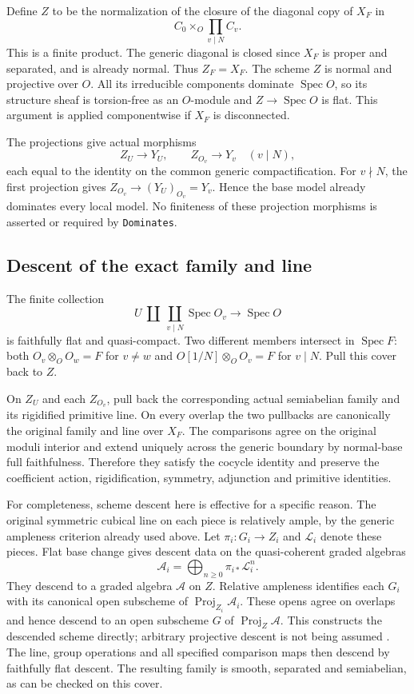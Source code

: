 Define $Z$ to be the normalization of the closure of the
diagonal copy of $X_F$ in
\[
                         C_0\times_O\prod_{v\mid N} C_v.
\]
This is a finite product.  The generic diagonal is closed since
$X_F$ is proper and separated, and is already normal.
Thus $Z_F=X_F$.  The scheme $Z$ is normal and projective over
$O$.  All its irreducible components dominate $\operatorname{Spec}O$,
so its structure sheaf is torsion-free as an $O$-module and
$Z\to\operatorname{Spec}O$ is flat.  This argument is applied
componentwise if $X_F$ is disconnected.

The projections give actual morphisms
\[
             Z_U\longrightarrow Y_U,
             \qquad Z_{O_v}\longrightarrow Y_v\quad(v\mid N),
\]
each equal to the identity on the common generic compactification.
For $v\nmid N$, the first projection gives
$Z_{O_v}\to(Y_U)_{O_v}=Y_v$.  Hence the base model already
dominates every local model.  No finiteness of these projection
morphisms is asserted or required by \texttt{Dominates}.

\subsection*{Descent of the exact family and line}

The finite collection
\[
 U\ \amalg\ \coprod_{v\mid N}\operatorname{Spec}O_v
                      \longrightarrow\operatorname{Spec}O
\]
is faithfully flat and quasi-compact.  Two different members
intersect in $\operatorname{Spec}F$: both
$O_v\otimes_OO_w=F$ for $v\ne w$ and
$O[1/N]\otimes_OO_v=F$ for $v\mid N$.
Pull this cover back to $Z$.

On $Z_U$ and each $Z_{O_v}$, pull back the corresponding actual
semiabelian family and its rigidified primitive line.
On every overlap the two pullbacks are canonically the original
family and line over $X_F$.  The comparisons agree on the
original moduli interior and extend uniquely across the generic
boundary by normal-base full faithfulness.  Therefore they
satisfy the cocycle identity and preserve the coefficient action,
rigidification, symmetry, adjunction and primitive identities.

For completeness, scheme descent here is effective for a
specific reason.  The original symmetric cubical line on each
piece is relatively ample, by the generic ampleness criterion
already used above.  Let $\pi_i:G_i\to Z_i$ and $\mathscr L_i$
denote these pieces.  Flat base change gives descent data on the
quasi-coherent graded algebras
\[
                 \mathcal A_i=\bigoplus_{n\geq0}
                           \pi_{i*}\mathscr L_i^n.
\]
They descend to a graded algebra $\mathcal A$ on $Z$.
Relative ampleness identifies each $G_i$ with its canonical
open subscheme of $\operatorname{Proj}_{Z_i}\mathcal A_i$.
These opens agree on overlaps and hence descend to an open
subscheme $G$ of $\operatorname{Proj}_Z\mathcal A$.
This constructs the descended scheme directly; arbitrary
projective descent is not being assumed
\cite[Tags 02KH, 01VJ and 0D2P]{global-model-stacks}.
The line, group operations and all specified comparison maps
then descend by faithfully flat descent.  The resulting family
is smooth, separated and semiabelian, as can be checked on this
cover.

